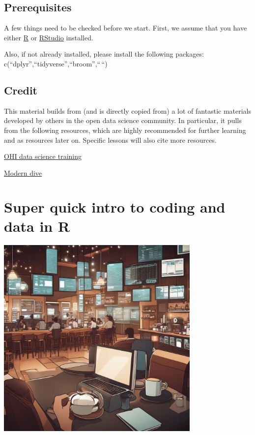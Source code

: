 \documentclass[
]{book}
\begin{document}
\hypertarget{prerequisites}{%
\section{Prerequisites}\label{prerequisites}}

A few things need to be checked before we start. First, we assume that
you have either \href{https://cloud.r-project.org/}{R} or
\href{https://www.rstudio.com/products/rstudio/download/}{RStudio}
installed.

Also, if not already installed, please install the following packages:
c(``dplyr'',``tidyverse'',``broom'',``\,``)

\hypertarget{credit}{%
\section{Credit}\label{credit}}

This material builds from (and is directly copied from) a lot of
fantastic materials developed by others in the open data science
community. In particular, it pulls from the following resources, which
are highly recommended for further learning and as resources later on.
Specific lessons will also cite more resources.

\href{https://ohi-science.org/data-science-training/overview.html}{OHI
data science training}

\href{https://moderndive.netlify.app/1-getting-started}{Modern dive}

\hypertarget{dataintro}{%
\chapter{Super quick intro to coding and data in R}\label{dataintro}}

\includegraphics[width=0.75\textwidth,height=\textheight]{Data_analyses.jpeg}
\end{document}
